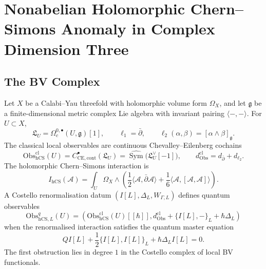 \providecommand{\CC}{\mathbb{C}}
\providecommand{\fg}{\mathfrak{g}}
\providecommand{\hCS}{\mathrm{hCS}}
\providecommand{\Obs}{\mathrm{Obs}}
\providecommand{\CE}{\mathrm{CE}}
\providecommand{\BV}{\mathrm{BV}}
\providecommand{\Tr}{\operatorname{Tr}}
\providecommand{\Sym}{\operatorname{Sym}}
\providecommand{\End}{\operatorname{End}}
\providecommand{\Rep}{\operatorname{Rep}}
\providecommand{\cA}{\mathcal{A}}
\providecommand{\cO}{\mathcal{O}}
\providecommand{\Eone}{E_1}
\providecommand{\Etwo}{E_2}
\providecommand{\kch}{\kappa_{\mathrm{ch}}}
\providecommand{\kcat}{\kappa_{\mathrm{cat}}}
\providecommand{\kBKM}{\kappa_{\mathrm{BKM}}}
\providecommand{\kfib}{\kappa_{\mathrm{fiber}}}

\section{Nonabelian Holomorphic Chern--Simons Anomaly in Complex Dimension Three}
\label{sec:hcs-nonabelian-anomaly}

\subsection{The BV Complex}
\label{subsec:hcs-bv-complex}

Let \(X\) be a Calabi--Yau threefold with holomorphic volume form
\(\Omega_X\), and let \(\fg\) be a finite-dimensional metric complex Lie
algebra with invariant pairing \(\langle-,-\rangle\). For
\(U\subset X\),
\[
  \mathfrak L_U=\Omega^{0,\bullet}_c(U,\fg)[1],
  \qquad
  \ell_1=\bar\partial,
  \qquad
  \ell_2(\alpha,\beta)=[\alpha\wedge\beta]_\fg .
\]
The classical local observables are continuous Chevalley--Eilenberg
cochains
\[
  \Obs^{\mathrm{cl}}_{\hCS}(U)
  =
  C^\bullet_{\CE,\mathrm{cont}}(\mathfrak L_U)
  =
  \widehat{\Sym}\bigl(\mathfrak L_U^\vee[-1]\bigr),
  \qquad
  d_{\Obs}^{\mathrm{cl}}=d_{\bar\partial}+d_{\ell_2}.
\]
The holomorphic Chern--Simons interaction is
\[
  I_{\hCS}(\cA)
  =
  \int_U \Omega_X\wedge
  \left(
    \frac12\langle\cA,\bar\partial\cA\rangle
    +\frac16\langle\cA,[\cA,\cA]\rangle
  \right).
\]
A Costello renormalisation datum \((I[L],\Delta_L,W_{\Gamma,L})\)
defines quantum observables
\[
  \Obs^q_{\hCS,L}(U)
  =
  \left(
  \Obs^{\mathrm{cl}}_{\hCS}(U)[[\hbar]],
  d_{\Obs}^{\mathrm{cl}}+\{I[L],-\}_{L}+\hbar\Delta_L
  \right)
\]
when the renormalised interaction satisfies the quantum master equation
\[
  QI[L]+\frac12\{I[L],I[L]\}_{L}+\hbar\Delta_L I[L]=0 .
\]
The first obstruction lies in degree \(1\) in the Costello complex of
local BV functionals.

